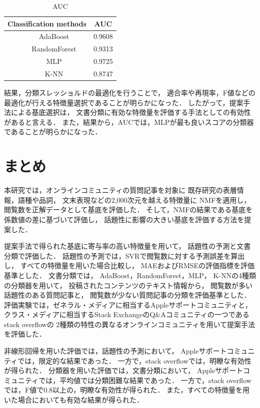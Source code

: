 \documentclass[12pt,a4paper,twocolumn,twoside]{jsik}
\begin{document}
%
\begin{table}[htb]
  \caption{AUC}
  \label{tab:nmf_auc}
  \begin{center}
  \begin{tabular}{c|c} \hline
    Classification methods & AUC \\ \hline \hline
　　AdaBoost & 0.9608 \\ \hline
　　RandomForest & 0.9313 \\ \hline
　　MLP & 0.9725 \\ \hline
　　K-NN & 0.8747 \\ \hline
  \end{tabular}
  \end{center}
\end{table}

結果，分類スレッショルドの最適化を行うことで，
適合率や再現率，F値などの最適化が行える特徴量選択であることが明らかになった．
したがって，提案手法による基底選択は，
文書分類に有効な特徴量を評価する手法としての有効性があると言える．
また，結果から，AUCでは，MLPが最も良いスコアの分類器であることが明らかになった．

\section{まとめ}
本研究では，オンラインコミュニティの質問記事を対象に
既存研究の表層情報，語種や品詞，
文末表現などの2,000次元を越える特徴量に
NMFを適用し，閲覧数を正解データとして基底を評価した．
%
そして，NMFの結果である基底を係数値の差に基づいて評価し，
話題性に影響の大きい基底を評価する方法を提案した．

提案手法で得られた基底に寄与率の高い特徴量を用いて，
話題性の予測と文書分類で評価した．
%
話題性の予測では，SVRで閲覧数に対する予測誤差を算出し，
すべての特徴量を用いた場合比較し，
MAEおよびRMSEの評価指標を評価基準とした．
%
文書分類では，
AdaBoost，RandomForest，MLP，
K-NNの4種類の分類器を用いて，
投稿されたコンテンツのテキスト情報から，
閲覧数が多い話題性のある質問記事と，
閲覧数が少ない質問記事の分類を評価基準とした．
%
評価実験では，ゼネラル・メディアに相当するAppleサポートコミュニティと，
クラス・メディアに相当するStack ExchangeのQ\&Aコミュニティの一つであるstack overflowの
2種類の特性の異なるオンラインコミュニティを用いて提案手法を評価した．

\newpage
非線形回帰を用いた評価では，話題性の予測において，
Appleサポートコミュニティでは，限定的な結果であった．
一方で，stack overflowでは，明瞭な有効性が得られた．
%
分類器を用いた評価では，文書分類において，
Appleサポートコミュニティでは，平均値では分類困難な結果であった．
一方で，stack overflowでは，F値で$0.8$以上の，明瞭な有効性が得られた．
また，すべての特徴量を用いた場合においても有効な結果が得られた．
\end{document}
